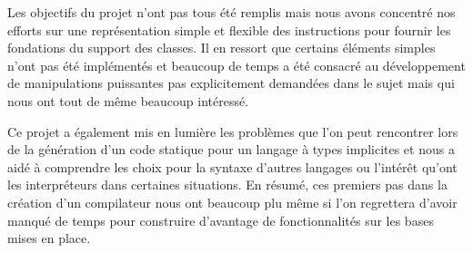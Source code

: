 \documentclass[12pt]{article}
\begin{document}
Les objectifs du projet n'ont pas tous été remplis mais nous avons concentré nos efforts sur une représentation simple et flexible des instructions pour fournir les fondations du support des classes. Il en ressort que certains éléments simples n'ont pas été implémentés et beaucoup de temps a été consacré au développement de manipulations puissantes pas explicitement demandées dans le sujet mais qui nous ont tout de même beaucoup intéressé.

Ce projet a également mis en lumière les problèmes que l'on peut rencontrer lors de la génération d'un code statique pour un langage à types implicites et nous a aidé à comprendre les choix pour la syntaxe d'autres langages ou l'intérêt qu'ont les interpréteurs dans certaines situations. En résumé, ces premiers pas dans la création d’un compilateur nous ont beaucoup plu même si l'on regrettera d'avoir manqué de temps pour construire d'avantage de fonctionnalités sur les bases mises en place.
\end{document}
